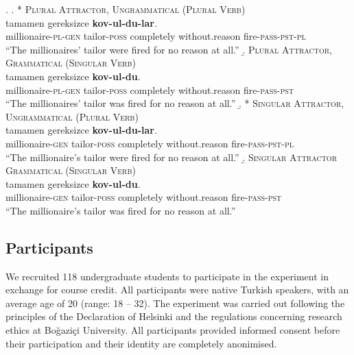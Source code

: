 \documentclass[]{interact}
\theoremstyle{plain}%
\theoremstyle{definition}
\theoremstyle{remark}
\begin{document}
\ex. \label{ex:our_items}
  \a. * \textsc{Plural Attractor, Ungrammatical (Plural Verb)} \label{ex:expitem-plpl}\\
   tamamen gereksizce \textbf{kov-ul-du-lar}.\\
  millionaire-\textsc{pl}-\textsc{gen} tailor-\textsc{poss} completely without.reason fire-\textsc{pass}-\textsc{pst}-\textsc{pl}\\
  \glt ``The millionaires' tailor were fired for no reason at all.''
  \b. \textsc{Plural Attractor, Grammatical (Singular Verb)} \label{ex:expitem-plsg} \\
   tamamen gereksizce \textbf{kov-ul-du}.\\
  millionaire-\textsc{pl}-\textsc{gen} tailor-\textsc{poss} completely without.reason fire-\textsc{pass}-\textsc{pst}\\
  \glt ``The millionaires' tailor was fired for no reason at all.''
  \b. * \textsc{Singular Attractor, Ungrammatical (Plural Verb)} \label{ex:expitem-sgpl}\\
   tamamen gereksizce \textbf{kov-ul-du-lar}.\\
  millionaire-\textsc{gen} tailor-\textsc{poss} completely without.reason fire-\textsc{pass}-\textsc{pst}-\textsc{pl}\\
  \glt ``The millionaire's tailor were fired for no reason at all.''
  \b. \textsc{Singular Attractor Grammatical (Singular Verb)} \label{ex:expitem-sgsg}\\
   tamamen gereksizce \textbf{kov-ul-du}.\\
  millionaire-\textsc{gen} tailor-\textsc{poss} completely without.reason fire-\textsc{pass}-\textsc{pst}\\
  \glt ``The millionaire's tailor was fired for no reason at all.''
  

\subsection{Participants} 


We recruited 118 undergraduate students to participate in the experiment in exchange for course credit. All participants were native Turkish speakers, with an average age of 20 (range: 18 -- 32). The experiment was carried out following the principles of the Declaration of Helsinki and the regulations concerning research ethics at Bo\u{g}azi\c{c}i University. All participants provided informed consent before their participation and their identity are completely anonimised.
\end{document}
